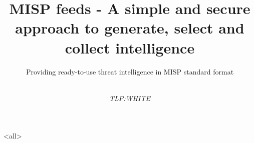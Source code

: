 \documentclass{beamerswitch}
\author{\small{} \\ \emph{TLP:WHITE}}
\title{MISP feeds - A simple and secure approach to generate, select and collect intelligence}
\subtitle{Providing ready-to-use threat intelligence in MISP standard format}
\institute{\href{http://www.misp-project.org/}{http://www.misp-project.org/} \\ Twitter: \emph{\href{https://twitter.com/mispproject}{@MISPProject}}}
\date{}
\begin{document}
\mode<all>

\end{document}
